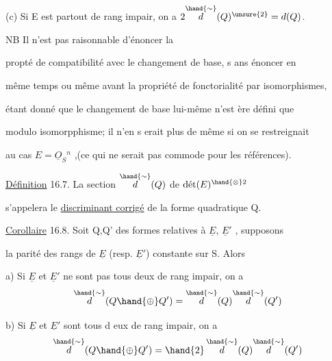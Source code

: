 
(c) Si E est partout de rang impair, on a $2\overset{\hand{\sim}}{d}(Q)^{\unsure{2}} = d(Q)$.


 \quad NB Il n'est pas raisonnable d'énoncer la

propté de compatibilité avec le changement de base, s ans énoncer en

même temps\hand{,} ou même avant\hand{,} la propriété de fonctorialité par isomorphismes,

étant donné que le changement de base  lui-même n'est ère défini que

modulo isomorpphisme; il n'en s erait plus de même si on se restreignait

au cas $E = \underline{O}_S{}^n$ ,(ce qui ne serait pas commode pour les références).

 \quad \uline{Définition} 16.7. La section $\overset{\hand{\sim}}{d}(Q)$ de $\text{dét}(E)^{\hand{\otimes}2}$

s'appelera le \uline{discriminant corrigé} de la forme quadratique Q.

\uline{Corollaire} 16.8. Soit Q,Q' des formes relatives à $\underline{E}$, $\underline{E}'$ , supposons

la parité des rangs de $\underline{E}$ (resp. $\underline{E}'$) constante sur S. Alors

a) Si $\underline{E}$ et $\underline{E}'$ ne sont pas tous deux de rang impair, on a
\[ \overset{\hand{\sim}}{d}(Q \hand{\oplus} Q') = \overset{\hand{\sim}}{d}(Q)\overset{\hand{\sim}}{d}(Q') \]

b) Si $\underline{E}$ et $\underline{E}'$ sont tous d eux de rang impair, on a
\[ \overset{\hand{\sim}}{d}(Q \hand{\oplus} Q') = \hand{2}\,\overset{\hand{\sim}}{d}(Q)\overset{\hand{\sim}}{d}(Q') \]

